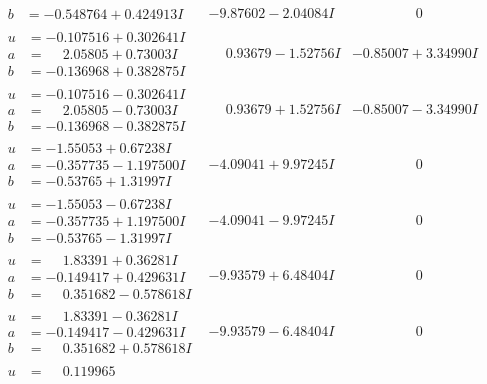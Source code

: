 \documentclass[1p]{elsarticle_modified}
\theoremstyle{definition}
\begin{document}
$$\begin{array}{c|c|c}
\begin{aligned}
b &= -0.548764 + 0.424913 I\end{aligned}
 & -9.87602 - 2.04084 I & \phantom{-0.000000 } 0 \\ \hline\begin{aligned}
u &= -0.107516 + 0.302641 I \\
a &= \phantom{-}2.05805 + 0.73003 I \\
b &= -0.136968 + 0.382875 I\end{aligned}
 & \phantom{-}0.93679 - 1.52756 I & -0.85007 + 3.34990 I \\ \hline\begin{aligned}
u &= -0.107516 - 0.302641 I \\
a &= \phantom{-}2.05805 - 0.73003 I \\
b &= -0.136968 - 0.382875 I\end{aligned}
 & \phantom{-}0.93679 + 1.52756 I & -0.85007 - 3.34990 I \\ \hline\begin{aligned}
u &= -1.55053 + 0.67238 I \\
a &= -0.357735 - 1.197500 I \\
b &= -0.53765 + 1.31997 I\end{aligned}
 & -4.09041 + 9.97245 I & \phantom{-0.000000 } 0 \\ \hline\begin{aligned}
u &= -1.55053 - 0.67238 I \\
a &= -0.357735 + 1.197500 I \\
b &= -0.53765 - 1.31997 I\end{aligned}
 & -4.09041 - 9.97245 I & \phantom{-0.000000 } 0 \\ \hline\begin{aligned}
u &= \phantom{-}1.83391 + 0.36281 I \\
a &= -0.149417 + 0.429631 I \\
b &= \phantom{-}0.351682 - 0.578618 I\end{aligned}
 & -9.93579 + 6.48404 I & \phantom{-0.000000 } 0 \\ \hline\begin{aligned}
u &= \phantom{-}1.83391 - 0.36281 I \\
a &= -0.149417 - 0.429631 I \\
b &= \phantom{-}0.351682 + 0.578618 I\end{aligned}
 & -9.93579 - 6.48404 I & \phantom{-0.000000 } 0 \\ \hline\begin{aligned}
u &= \phantom{-}0.119965\phantom{ +0.000000I} \\

\end{aligned}
\end{array}$$
\end{document}
